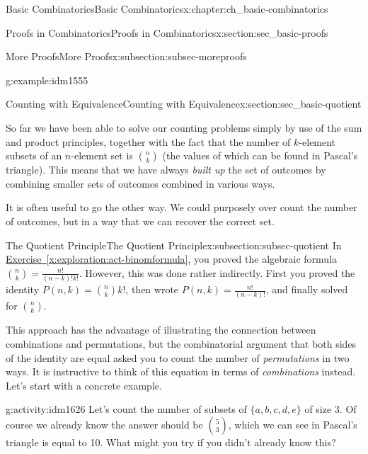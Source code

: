 \documentclass[oneside,10pt,]{book}
\numberwithin{equation}{chapter}
\begin{document}
\begin{chapterptx}{Basic Combinatorics}{}{Basic Combinatorics}{}{}{x:chapter:ch_basic-combinatorics}
\begin{sectionptx}{Proofs in Combinatorics}{}{Proofs in Combinatorics}{}{}{x:section:sec_basic-proofs}
\begin{subsectionptx}{More Proofs}{}{More Proofs}{}{}{x:subsection:subsec-moreproofs}
\begin{example}{}{g:example:idm1555}
\begin{enumerate}
\end{enumerate}
%
\end{example}
\end{subsectionptx}
\end{sectionptx}
%
%
\typeout{************************************************}
\typeout{************************************************}
%
\begin{sectionptx}{Counting with Equivalence}{}{Counting with Equivalence}{}{}{x:section:sec_basic-quotient}
\begin{introduction}{}%
So far we have been able to solve our counting problems simply by use of the sum and product principles, together with the fact that the number of \(k\)-element subsets of an \(n\)-element set is \(\binom{n}{k}\) (the values of which can be found in Pascal's triangle). This means that we have always \emph{built up} the set of outcomes by combining smaller sets of outcomes combined in various ways.%
\par
It is often useful to go the other way.  We could purposely over count the number of outcomes, but in a way that we can recover the correct set.%
\end{introduction}%
%
%
\typeout{************************************************}
\typeout{************************************************}
%
\begin{subsectionptx}{The Quotient Principle}{}{The Quotient Principle}{}{}{x:subsection:subsec-quotient}
In \hyperref[x:exploration:act-binomformula]{Exercise~\ref{x:exploration:act-binomformula}}, you proved the algebraic formula \(\binom{n}{k} = \frac{n!}{(n-k)!k!}\).  However, this was done rather indirectly.  First you proved the identity \(P(n,k) = \binom{n}{k}k!\), then wrote \(P(n,k) = \frac{n!}{(n-k)!}\), and finally solved for \(\binom{n}{k}\).%
\par
This approach has the advantage of illustrating the connection between combinations and permutations, but the combinatorial argument that both sides of the identity are equal asked you to count the number of \emph{permutations} in two ways.  It is instructive to think of this equation in terms of \emph{combinations} instead.  Let's start with a concrete example.%
\begin{activity}{}{g:activity:idm1626}%
Let's count the number of subsets of \(\{a,b,c,d,e\}\) of size 3.  Of course we already know the answer should be \(\binom{5}{3}\), which we can see in Pascal's triangle is equal to 10.  What might you try if you didn't already know this?%

\end{activity}
\end{subsectionptx}
\end{sectionptx}
\end{chapterptx}
\end{document}
